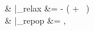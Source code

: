 \bea
{} &\!\!\!\!\!\! \bigg|_{relax} \!\!\! &= \:\:\: - \left( \hat{\Gamma} \rho + \rho \,\hat{\Gamma} \right) 
\label{eq:relax} \\
 &\!\!\!\!\!\!  \bigg|_{repop} \!\!\! &= \:\:\: \hat{\Lambda},
\label{eq:repop} 
\eea
